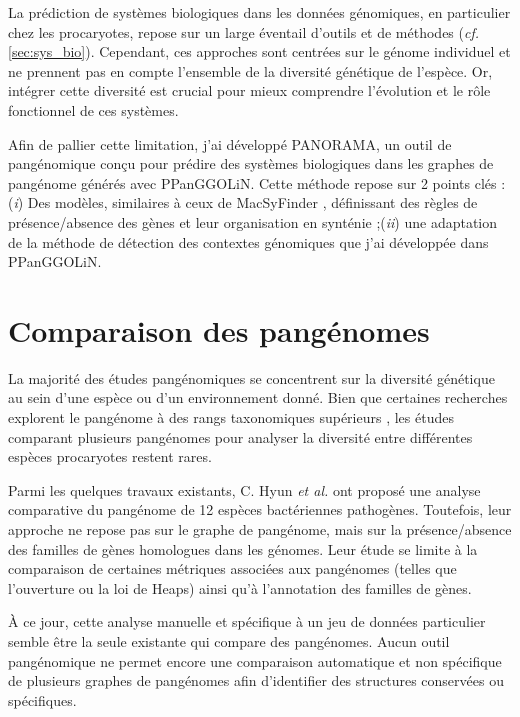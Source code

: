 La prédiction de systèmes biologiques dans les données génomiques, en particulier chez les procaryotes, repose sur un large éventail d’outils et de méthodes (\textit{cf.} \autoref{sec:sys_bio}). Cependant, ces approches sont centrées sur le génome individuel et ne prennent pas en compte l’ensemble de la diversité génétique de l'espèce. Or, intégrer cette diversité est crucial pour mieux comprendre l’évolution et le rôle fonctionnel de ces systèmes.

Afin de pallier cette limitation, j’ai développé PANORAMA, un outil de pangénomique conçu pour prédire des systèmes biologiques dans les graphes de pangénome générés avec PPanGGOLiN. Cette méthode repose sur 2 points clés : (\textit{i}) Des modèles, similaires à ceux de MacSyFinder \cite{abby_macsyfinder_2014}, définissant des règles de présence/absence des gènes et leur organisation en synténie ;(\textit{ii}) une adaptation de la méthode de détection des contextes génomiques que j'ai développée dans PPanGGOLiN.

\section{Comparaison des pangénomes}

La majorité des études pangénomiques se concentrent sur la diversité génétique au sein d’une espèce ou d’un environnement donné. Bien que certaines recherches explorent le pangénome à des rangs taxonomiques supérieurs \cite{moulana_selection_2020}, les études comparant plusieurs pangénomes pour analyser la diversité entre différentes espèces procaryotes restent rares.

\newpage

Parmi les quelques travaux existants, C. Hyun \textit{et al.} \cite{hyun_comparative_2022} ont proposé une analyse comparative du pangénome de 12 espèces bactériennes pathogènes. Toutefois, leur approche ne repose pas sur le graphe de pangénome, mais sur la présence/absence des familles de gènes homologues dans les génomes. Leur étude se limite à la comparaison de certaines métriques associées aux pangénomes (telles que l’ouverture ou la loi de Heaps) ainsi qu’à l’annotation des familles de gènes.

À ce jour, cette analyse manuelle et spécifique à un jeu de données particulier semble être la seule existante  qui compare des pangénomes. Aucun outil pangénomique ne permet encore une comparaison automatique et non spécifique de plusieurs graphes de pangénomes afin d’identifier des structures conservées ou spécifiques.

